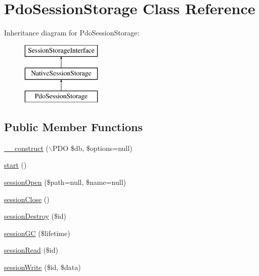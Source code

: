 \hypertarget{class_symfony_1_1_component_1_1_http_foundation_1_1_session_storage_1_1_pdo_session_storage}{
\section{\-Pdo\-Session\-Storage \-Class \-Reference}
\label{class_symfony_1_1_component_1_1_http_foundation_1_1_session_storage_1_1_pdo_session_storage}
}
\-Inheritance diagram for \-Pdo\-Session\-Storage\-:\begin{figure}[H]
\begin{center}
\leavevmode
\includegraphics[height=3.000000cm]{class_symfony_1_1_component_1_1_http_foundation_1_1_session_storage_1_1_pdo_session_storage}
\end{center}
\end{figure}
\subsection*{\-Public \-Member \-Functions}
\begin{DoxyCompactItemize}
\item 
\hyperlink{class_symfony_1_1_component_1_1_http_foundation_1_1_session_storage_1_1_pdo_session_storage_ac3d45478b892e61eac4a5d6ee77122e3}{\-\_\-\-\_\-construct} ($\backslash$\-P\-D\-O \$db, \$options=null)
\item 
\hyperlink{class_symfony_1_1_component_1_1_http_foundation_1_1_session_storage_1_1_pdo_session_storage_af8fa59992209e36dccb3eefb0f75531f}{start} ()
\item 
\hyperlink{class_symfony_1_1_component_1_1_http_foundation_1_1_session_storage_1_1_pdo_session_storage_a3459ba99cac83957d4af8d7fc41a0d92}{session\-Open} (\$path=null, \$name=null)
\item 
\hyperlink{class_symfony_1_1_component_1_1_http_foundation_1_1_session_storage_1_1_pdo_session_storage_a1cdaef3bc11fefe27825850088848e0c}{session\-Close} ()
\item 
\hyperlink{class_symfony_1_1_component_1_1_http_foundation_1_1_session_storage_1_1_pdo_session_storage_a57de760698d4a775d2e31f6342dfef07}{session\-Destroy} (\$id)
\item 
\hyperlink{class_symfony_1_1_component_1_1_http_foundation_1_1_session_storage_1_1_pdo_session_storage_a7f05355413742bdd16e7feb66bff3bfc}{session\-G\-C} (\$lifetime)
\item 
\hyperlink{class_symfony_1_1_component_1_1_http_foundation_1_1_session_storage_1_1_pdo_session_storage_a683ea7db0e432689a7dea9d27a3673c0}{session\-Read} (\$id)
\item 
\hyperlink{class_symfony_1_1_component_1_1_http_foundation_1_1_session_storage_1_1_pdo_session_storage_aa3be326788d6e143a5f2773ae5cbf8c7}{session\-Write} (\$id, \$data)
\end{DoxyCompactItemize}
